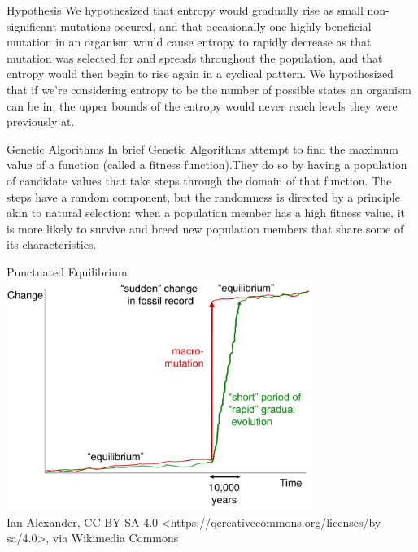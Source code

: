 \documentclass[10pt,aspectratio=169]{beamer}
\begin{document}
\begin{frame}{Hypothesis}
	We hypothesized that entropy would gradually rise as small non-significant
	mutations occured, and that occasionally one highly beneficial mutation in
	an organism would cause entropy to rapidly decrease as that mutation was
	selected for and spreads throughout the population, and that entropy would then
	begin to rise again in a cyclical pattern. We hypothesized that if we're considering
	entropy to be the number of possible states an organism can be in, the
	upper bounds of the entropy would never reach levels they were previously at.
\end{frame}

\begin{frame}{Genetic Algorithms}
	In brief Genetic Algorithms attempt to find the maximum value
        of a function (called a fitness function).They do so by having
        a population of candidate values that take steps through the
        domain of that function.  The steps have a random component,
        but the randomness is directed by a principle akin to natural
        selection: when a population member has a high fitness value,
        it is more likely to survive and breed new population members
        that share some of its characteristics.
	\begin{center}
	\end{center}
\end{frame}

\begin{frame}{Punctuated Equilibrium}
      	\centering
        \includegraphics[width=0.75\textwidth]{Punctuated_Equilibrium.pdf}\\ \tiny
        Ian Alexander, CC BY-SA 4.0
        <https://qcreativecommons.org/licenses/by-sa/4.0>, via
        Wikimedia Commons
\end{frame}
\end{document}
